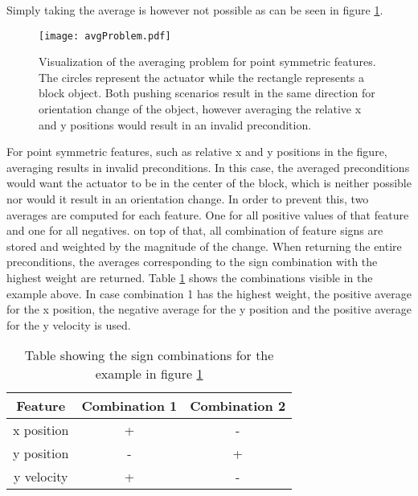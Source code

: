 Simply taking the average is however not possible as can be seen in figure \ref{fig:avgProblem}.

\begin{figure}
	\centering
	\texttt{[image: avgProblem.pdf]}
	\caption{Visualization of the averaging problem for point symmetric features. The circles represent the actuator while the rectangle represents a block object. Both pushing scenarios result in the same direction for orientation change of the object, however averaging the relative x and y positions would result in an invalid precondition.} 
	\label{fig:avgProblem}
\end{figure}

For point symmetric features, such as relative x and y positions in the figure, averaging results in invalid preconditions. In this case, the averaged preconditions would want the actuator to be in the center of the block, which is neither possible nor would it result in an orientation change. In order to prevent this, two averages are computed for each feature. One for all positive values of that feature and one for all negatives. on top of that, all combination of feature signs are stored and weighted by the magnitude of the change. When returning the entire preconditions, the averages corresponding to the sign combination with the highest weight are returned. Table \ref{tab:signCombinations} shows the combinations visible in the example above. In case combination 1 has the highest weight, the positive average for the x position, the negative average for the y position and the positive average for the y velocity is used. 

\begin{table}
	\centering
\begin{tabular}{|c|c|c|}
	\hline Feature & Combination 1 & Combination 2 \\ 
	\hline x position & + & - \\ 
	\hline y position & - & + \\ 
	\hline y velocity & + & - \\ 
	\hline 
\end{tabular} 
\caption{Table showing the sign combinations for the example in figure \ref{fig:avgProblem}}
\label{tab:signCombinations}
\end{table}

